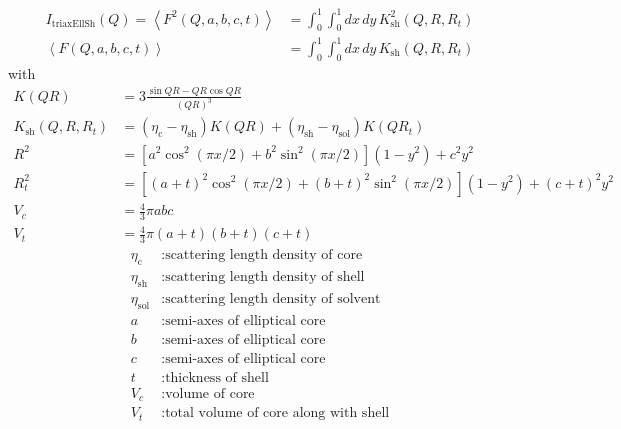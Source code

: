 \begin{align}
I_\text{triaxEllSh}(Q) = \left\langle F^2(Q,a,b,c,t) \right\rangle &= \int^1_0 \int ^1_0 dx\,dy\, K_\text{sh}^2(Q,R,R_t)\\
\left\langle F(Q,a,b,c,t) \right\rangle & = \int^1_0 \int ^1_0 dx\,dy\, K_\text{sh}(Q,R,R_t)
\end{align}
with
\begin{align}
K(QR)         &= 3 \frac{\sin QR - QR\cos QR}{(QR)^3} \\
K_\text{sh}(Q,R,R_t) &= \left(\eta_\text{c}-\eta_\text{sh}\right)K(QR)+\left(\eta_\text{sh}-\eta_\text{sol}\right)K(QR_t) \\
R^2 &= \left[a^2\cos^2\left(\pi x/2\right) + b^2\sin^2\left(\pi x/2\right)\right](1-y^2)+c^2y^2 \nonumber \\
R_t^2 &= \left[(a+t)^2\cos^2\left(\pi x/2\right) + (b+t)^2\sin^2\left(\pi x/2\right)\right](1-y^2)+(c+t)^2y^2
\nonumber \\
V_c &= \frac{4}{3}\pi abc \nonumber \\
V_t &= \frac{4}{3}\pi (a+t)(b+t)(c+t) \nonumber
\end{align}
\begin{align}
\eta_\text{c} &: \text{scattering length density of core} \nonumber \\
\eta_\text{sh} &: \text{scattering length density of shell} \nonumber \\
\eta_\text{sol} &: \text{scattering length density of solvent} \nonumber \\
a &: \text{semi-axes of elliptical core} \nonumber \\
b &: \text{semi-axes of elliptical core} \nonumber \\
c &: \text{semi-axes of elliptical core} \nonumber \\
t &: \text{thickness of shell} \nonumber \\
V_c &: \text{volume of core} \nonumber \\
V_t &: \text{total volume of core along with shell} \nonumber
\end{align}

